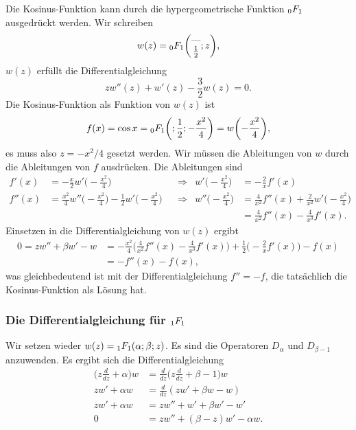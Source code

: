 \begin{beispiel}
Die Kosinus-Funktion kann durch die hypergeometrische Funktion
$\mathstrut_0F_1$ ausgedrückt werden.
Wir schreiben 
\[
w(z)
=
\mathstrut_0F_1\biggl(
\begin{matrix}\text{---}\\\frac12\end{matrix}
;z\biggr),
\]
$w(z)$ erfüllt die Differentialgleichung
\[
zw''(z) +w'(z) -\frac{3}{2} w(z) = 0.
\]
Die Kosinus-Funktion als Funktion von $w(z)$ ist
\[
f(x)
=
\cos x = \mathstrut_0F_1\biggl(;\frac12;-\frac{x^2}4\biggr)
=
w\biggl(-\frac{x^2}4\biggr),
\]
es muss also $z=-x^2/4$ gesetzt werden.
Wir müssen die Ableitungen von $w$ durch die Ableitungen von $f$
ausdrücken.
Die Ableitungen sind
\begin{align*}
f'(x)
&=
-\frac{x}{2}
w'\biggl(-\frac{x^2}4\biggr)
&&\Rightarrow&
w'\biggl(-\frac{x^2}4\biggr)
&=
-\frac{2}{x}f'(x)
\\
f''(x)
&=
\frac{x^2}{4}w''\biggl(-\frac{x^2}4\biggr)
-\frac12w'\biggl(-\frac{x^2}4\biggr)
&&\Rightarrow&
w''\biggl(-\frac{x^2}4\biggr)
&=
\frac{4}{x^2}f''(x)
+\frac{2}{x^2}w'\biggl(-\frac{x^2}4\biggr)
\\
&&&&
&=
\frac{4}{x^2}f''(x)
-\frac{4}{x^3}f'(x).
\end{align*}
Einsetzen in die Differentialgleichung von $w(z)$ ergibt
\begin{align*}
0=
zw''+\beta w'-w
&=
-\frac{x^2}4
\biggl(
\frac{4}{x^2}f''(x)-\frac{4}{x^3}f'(x)
\biggr)
+\frac12\biggl(
-\frac2xf'(x)
\biggr)
-f(x)
\\
&=
-f''(x)
-f(x),
\end{align*}
was gleichbedeutend ist mit der Differentialgleichung $f''=-f$, die
tatsächlich die Kosinus-Funktion als Lösung hat.
\end{beispiel}

%
%
\subsubsection{Die Differentialgleichung für $\mathstrut_1F_1$}
Wir setzen wieder $w(z) = \mathstrut_1F_1(\alpha;\beta;z)$.
Es sind die Operatoren $D_\alpha$ und $D_{\beta-1}$ anzuwenden.
Es ergibt sich die Differentialgleichung
\begin{align*}
\biggl(z\frac{d}{dz}+\alpha\biggr)w
&=
\frac{d}{dz}\biggl(z\frac{d}{dz} +\beta-1\biggr)w
\\
zw'+\alpha w
&=
\frac{d}{dz}
(zw'+\beta w - w)
\\
zw'+\alpha w
&=
zw'' +w'+\beta w' - w'
\\
0
&=
zw'' + (\beta - z)w' - \alpha w.
\end{align*}

